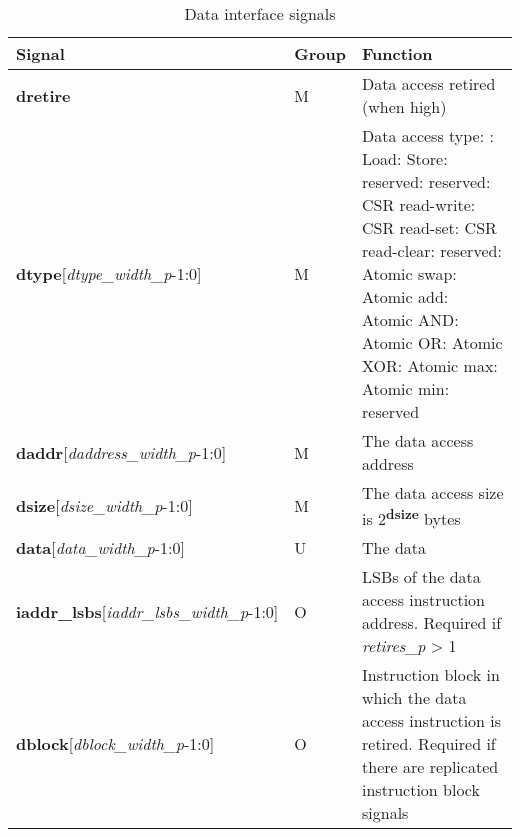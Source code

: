 \begin{table}[htp]
    \centering
    \caption{Data interface signals}
    \label{tab:data-ingress}
    \begin{tabulary}{\textwidth}{|l|l|p{80mm}|}
        \hline
        \textbf{Signal} & \textbf{Group} & \textbf{Function} \\
        \hline
        \textbf{dretire} & M & Data access retired (when high)\\
        \hline
        \textbf{dtype}[\textit{dtype\_width\_p}-1:0] & M & Data access type: : Load: Store: reserved: reserved: CSR read-write: CSR read-set: CSR read-clear: reserved: Atomic swap: Atomic add: Atomic AND: Atomic OR: Atomic XOR: Atomic max: Atomic min: reserved\\
        \hline
        \textbf{daddr}[\textit{daddress\_width\_p}-1:0] & M & The data access address\\
        \hline
        \textbf{dsize}[\textit{dsize\_width\_p}-1:0] & M & The data access size is 2\textsuperscript{\textbf{dsize}} bytes\\
        \hline
        \textbf{data}[\textit{data\_width\_p}-1:0] & U & The data\\
        \hline
        \textbf{iaddr\_lsbs}[\textit{iaddr\_lsbs\_width\_p}-1:0] & O & LSBs of the data access instruction address.  Required if \textit{retires\_p} > 1\\
        \hline
        \textbf{dblock}[\textit{dblock\_width\_p}-1:0] & O & Instruction block in which the data access instruction is retired.  Required if there 
          are replicated instruction block signals\\

\end{tabulary}
\end{table}
